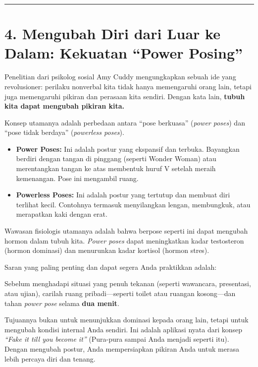 \documentclass[
  letterpaper,
  DIV=11,
  numbers=noendperiod]{scrreprt}
\begin{document}
\begin{center}\rule{0.5\linewidth}{0.5pt}\end{center}

\section{4. Mengubah Diri dari Luar ke Dalam: Kekuatan ``Power
Posing''}\label{mengubah-diri-dari-luar-ke-dalam-kekuatan-power-posing}

Penelitian dari psikolog sosial Amy Cuddy mengungkapkan sebuah ide yang
revolusioner: perilaku nonverbal kita tidak hanya memengaruhi orang
lain, tetapi juga memengaruhi pikiran dan perasaan kita sendiri. Dengan
kata lain, \textbf{tubuh kita dapat mengubah pikiran kita.}

Konsep utamanya adalah perbedaan antara ``pose berkuasa'' (\emph{power
poses}) dan ``pose tidak berdaya'' (\emph{powerless poses}).

\begin{itemize}
\item
  \textbf{Power Poses:} Ini adalah postur yang ekspansif dan terbuka.
  Bayangkan berdiri dengan tangan di pinggang (seperti Wonder Woman)
  atau merentangkan tangan ke atas membentuk huruf V setelah meraih
  kemenangan. Pose ini mengambil ruang.
\item
  \textbf{Powerless Poses:} Ini adalah postur yang tertutup dan membuat
  diri terlihat kecil. Contohnya termasuk menyilangkan lengan,
  membungkuk, atau merapatkan kaki dengan erat.
\end{itemize}

Wawasan fisiologis utamanya adalah bahwa berpose seperti ini dapat
mengubah hormon dalam tubuh kita. \emph{Power poses} dapat meningkatkan
kadar testosteron (hormon dominasi) dan menurunkan kadar kortisol
(hormon stres).

Saran yang paling penting dan dapat segera Anda praktikkan adalah:

Sebelum menghadapi situasi yang penuh tekanan (seperti wawancara,
presentasi, atau ujian), carilah ruang pribadi---seperti toilet atau
ruangan kosong---dan tahan \emph{power pose} selama \textbf{dua menit}.

Tujuannya bukan untuk menunjukkan dominasi kepada orang lain, tetapi
untuk mengubah kondisi internal Anda sendiri. Ini adalah aplikasi nyata
dari konsep \emph{``Fake it till you become it''} (Pura-pura sampai Anda
menjadi seperti itu). Dengan mengubah postur, Anda mempersiapkan pikiran
Anda untuk merasa lebih percaya diri dan tenang.
\end{document}
